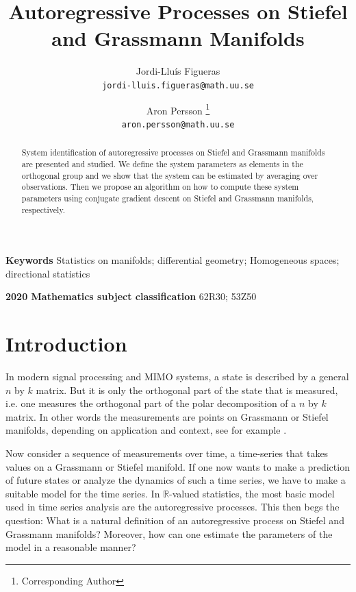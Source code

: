 \documentclass[12pt,a4paper]{article}
\title{Autoregressive Processes on Stiefel and Grassmann Manifolds}
\author{Jordi-Llu\'{i}s Figueras\footremember{upps}{Department of Mathematics, Uppsala University}\footremember{huawei}{Partially funded by Huawei technologies.} \\
\small{\texttt{jordi-lluis.figueras@math.uu.se}}
\and
Aron Persson\footrecall{upps} \footrecall{huawei} \footnote{Corresponding Author}   \\
\small{\texttt{aron.persson@math.uu.se}}
}
\theoremstyle{definition}
\theoremstyle{remark}
\begin{document}
\maketitle


\begin{abstract}
System identification of autoregressive processes on Stiefel and Grassmann manifolds are presented and studied. We define the system parameters as elements in the orthogonal group and we show that the system can be estimated by averaging over observations. Then we propose an algorithm on how to compute these system parameters using conjugate gradient descent on Stiefel and Grassmann manifolds, respectively.
\end{abstract}


\textbf{Keywords} Statistics on manifolds; differential geometry; Homogeneous spaces; directional statistics

\textbf{2020 Mathematics subject classification} 62R30; 53Z50






\section{Introduction}
\label{sec:intro}

In modern signal processing and MIMO systems, a state is described by a general $n$ by $k$ matrix. But it is only the orthogonal part of the state that is measured, i.e. one measures the orthogonal part of the polar decomposition of a $n$ by $k$ matrix. In other words the measurements are points on Grassmann or Stiefel manifolds, depending on application and context, see for example \cite{Kim2020stochcons,kong2022momentum,li2013riemannian,schwarz2014predictive,solo2014approach,xue2020blind}.

Now consider a sequence of measurements over time, a time-series that takes values on a Grassmann or Stiefel manifold. If one now wants to make a prediction of future states or analyze the dynamics of such a time series, we have to make a suitable model for the time series. In $\mathbb{R}$-valued statistics, the most basic model used in time series analysis are the autoregressive processes. This then begs the question: What is a natural definition of an autoregressive process on Stiefel and Grassmann manifolds? Moreover, how can one estimate the parameters of the model in a reasonable manner?
\end{document}
